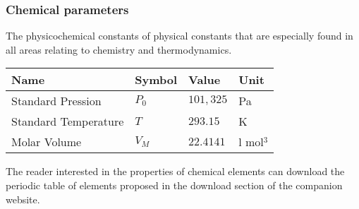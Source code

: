 	\subsubsection{Chemical parameters}
	The physicochemical constants of physical constants that are especially found in all areas relating to chemistry and thermodynamics.
		\begin{center}
	\begin{tabular}{||l|lll||}
	\hline
	{\textbf{Name}}&{\textbf{Symbol}}&{\textbf{Value}}&{\textbf{Unit}}\\
	\hline
	\hline
	Standard Pression		&$P_0$&$101,325$&Pa\\
	Standard Temperature	&$T$&$293.15$&K\\
	Molar Volume         	&$V_M$&$22.4141$&l mol$^{3}$\\
	\hline
	\end{tabular}
	\end{center}
	\begin{tcolorbox}[title=Remark,colframe=black,arc=10pt]
	The reader interested in the properties of chemical elements can download the periodic table of elements proposed in the download section of the companion website.
	\end{tcolorbox}
	
	\pagebreak	

